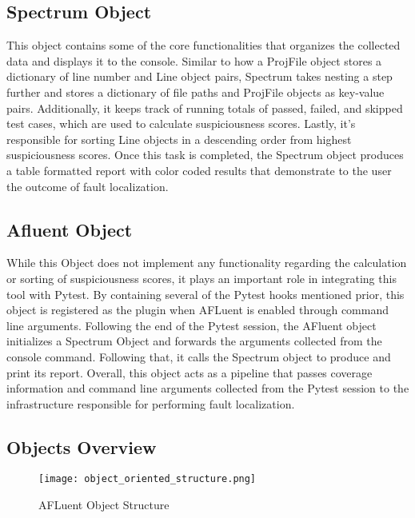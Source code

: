 \subsection{Spectrum Object}
\label{subsec:spectrum_obj}

This object contains some of the core functionalities that organizes the
collected data and displays it to the console. Similar to how a ProjFile object
stores a dictionary of line number and Line object pairs, Spectrum takes nesting
a step further and stores a dictionary of file paths and ProjFile objects as
key-value pairs. Additionally, it keeps track of running totals of passed,
failed, and skipped test cases, which are used to calculate suspiciousness
scores. Lastly, it's responsible for sorting Line objects in a descending order
from highest suspiciousness scores. Once this task is completed, the Spectrum
object produces a table formatted report with color coded results that
demonstrate to the user the outcome of fault localization.

\subsection{Afluent Object}
\label{subsec:afluent_obj}

While this Object does not implement any functionality regarding the calculation
or sorting of suspiciousness scores, it plays an important role in integrating
this tool with Pytest. By containing several of the Pytest hooks mentioned
prior, this object is registered as the plugin when AFLuent is enabled through
command line arguments. Following the end of the Pytest session, the AFluent
object initializes a Spectrum Object and forwards the arguments collected from
the console command. Following that, it calls the Spectrum object to produce and
print its report. Overall, this object acts as a pipeline that passes coverage
information and command line arguments collected from the Pytest session to the
infrastructure responsible for performing fault localization.

\subsection{Objects Overview}
\label{subsec:obj_overview}

\begin{figure}[!htb]
	\begin{center}
		\texttt{[image: object\_oriented\_structure.png]}
		\caption{\label{fig:oop_structure} AFLuent Object Structure}
	\end{center}
\end{figure}

